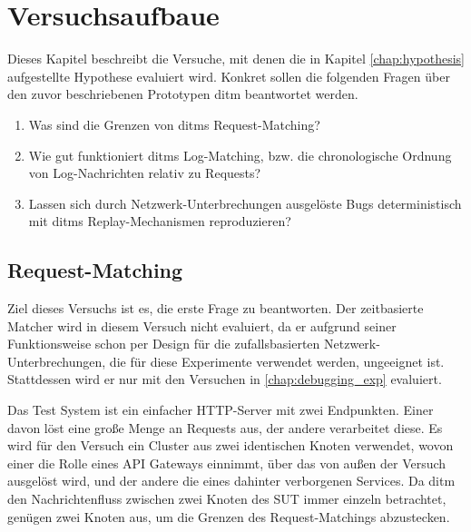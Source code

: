 \documentclass[12pt,a4paper]{report}
\begin{document}
\chapter{Versuchsaufbaue}
\label{chap:experiments}
Dieses Kapitel beschreibt die Versuche, mit denen die in Kapitel \ref{chap:hypothesis} aufgestellte Hypothese evaluiert wird.
Konkret sollen die folgenden Fragen über den zuvor beschriebenen Prototypen ditm beantwortet werden.
\begin{enumerate}
	\item Was sind die Grenzen von ditms Request-Matching?
	\item Wie gut funktioniert ditms Log-Matching, bzw. die chronologische Ordnung von Log-Nachrichten relativ zu Requests?
	\item Lassen sich durch Netzwerk-Unterbrechungen ausgelöste Bugs deterministisch mit ditms Replay-Mechanismen reproduzieren?
\end{enumerate}
\section{Request-Matching}
\label{chap:exp_matching}
Ziel dieses Versuchs ist es, die erste Frage zu beantworten.
Der zeitbasierte Matcher wird in diesem Versuch nicht evaluiert, da er aufgrund seiner Funktionsweise schon per Design für die
zufallsbasierten Netzwerk-Unterbrechungen, die für diese Experimente verwendet werden, ungeeignet ist. Stattdessen wird er nur mit
den Versuchen in \ref{chap:debugging_exp} evaluiert.

Das Test System ist ein einfacher HTTP-Server mit zwei Endpunkten. Einer davon löst eine große Menge an Requests aus, der andere
verarbeitet diese. Es wird für den Versuch ein Cluster aus zwei identischen Knoten verwendet, wovon einer die Rolle eines API
Gateways einnimmt, über das von außen der Versuch ausgelöst wird, und der andere die eines dahinter verborgenen Services. Da ditm
den Nachrichtenfluss zwischen zwei Knoten des SUT immer einzeln betrachtet, genügen zwei Knoten aus, um die Grenzen des
Request-Matchings abzustecken.
\end{document}
